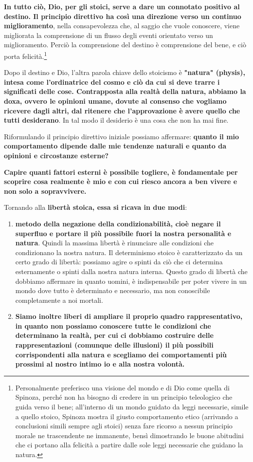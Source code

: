 \documentclass[a4paper,12pt,oneside]{article}%
\begin{document}
\textbf{In tutto ciò,  Dio, per gli stoici, serve a dare un connotato positivo al destino. Il principio direttivo ha così una direzione verso un continuo miglioramento}, nella consapevolezza che, al saggio che vuole conoscere, viene migliorata la comprensione di un flusso degli eventi orientato verso un miglioramento. Perciò la comprensione del destino è comprensione del bene, e ciò porta felicità.\footnote{Personalmente preferisco una visione del mondo e di Dio come quella di Spinoza, perché non ha bisogno di credere in un principio teleologico che guida verso il bene; all'interno di un mondo guidato da leggi necessarie, simile a quello stoico, Spinoza mostra il giusto comportamento etico (arrivando a conclusioni simili sempre agli stoici) senza fare ricorso a nessun principio morale ne trascendente ne immanente, bensì dimostrando le buone abitudini che ci portano alla felicità a partire dalle sole leggi necessarie che guidano la natura. }

Dopo il destino e Dio, l'altra parola chiave dello stoicismo è \textbf{"natura" (physis), intesa come l'ordinatrice del cosmo e ciò da cui si deve trarre i significati delle cose. Contrapposta alla realtà della natura, abbiamo la doxa, ovvero le opinioni umane, dovute al consenso che vogliamo ricevere dagli altri, dal ritenere che l'approvazione è avere quello che tutti desiderano}. In tal modo il desiderio è una cosa che non ha mai fine.

Riformulando il principio direttivo iniziale possiamo affermare:\textbf{ quanto il mio comportamento dipende dalle mie tendenze naturali e quanto da opinioni e circostanze esterne?}

\textbf{Capire quanti fattori esterni è possibile togliere, è fondamentale per scoprire cosa realmente è mio e con cui riesco ancora a ben vivere e non solo a sopravvivere.}

Tornando alla \textbf{libertà stoica, essa si ricava in due modi}:

\begin{enumerate}
	\item \textbf{metodo della negazione della condizionabilità, cioè negare il superfluo e portare il più possibile fuori la nostra personalità e natura}. Quindi la massima libertà è rinunciare alle condizioni che condizionano la nostra natura. Il determinismo stoico  è caratterizzato da un certo grado di libertà: possiamo agire o spinti da ciò che ci determina esternamente o spinti dalla nostra natura interna. Questo grado di libertà che dobbiamo affermare in quanto uomini, è indispensabile per poter vivere in un mondo dove tutto è determinato e necessario, ma non conoscibile completamente a noi mortali.
	
	\item \textbf{Siamo inoltre liberi di ampliare il proprio quadro rappresentativo, in quanto non possiamo conoscere tutte le condizioni che determinano la realtà, per cui ci dobbiamo costruire delle  rappresentazioni (comunque delle illusioni) il più possibili corrispondenti alla natura e scegliamo dei comportamenti più prossimi al nostro intimo io e alla nostra volontà. }
\end{enumerate}
\end{document}
